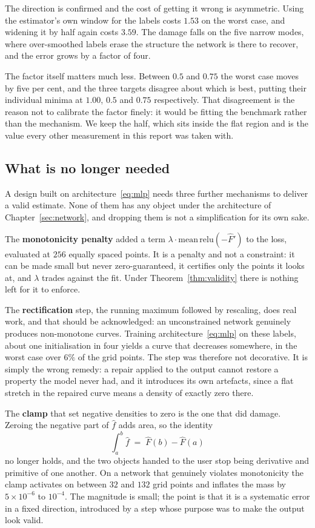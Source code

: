 \documentclass[11pt]{article}
\newcommand{\Fhat}{\widehat{F}}
\newcommand{\fhat}{\widehat{f}}
\begin{document}
The direction is confirmed and the cost of getting it wrong is asymmetric. Using the
estimator's own window for the labels costs $1.53$ on the worst case, and widening it by half
again costs $3.59$. The damage falls on the five narrow modes, where over-smoothed labels
erase the structure the network is there to recover, and the error grows by a factor of four.

The factor itself matters much less. Between $0.5$ and $0.75$ the worst case moves by five
per cent, and the three targets disagree about which is best, putting their individual minima
at $1.00$, $0.5$ and $0.75$ respectively. That disagreement is the reason not to calibrate the
factor finely: it would be fitting the benchmark rather than the mechanism. We keep the half,
which sits inside the flat region and is the value every other measurement in this report was
taken with.

\subsection{What is no longer needed}

A design built on architecture~\eqref{eq:mlp} needs three further mechanisms to deliver a
valid estimate. None of them has any object under the architecture of
Chapter~\ref{sec:network}, and dropping them is not a simplification for its own sake.

The \textbf{monotonicity penalty} added a term $\lambda \cdot \mathrm{mean}\,
\mathrm{relu}(-\Fhat')$ to the loss, evaluated at $256$ equally spaced points. It is a
penalty and not a constraint: it can be made small but never zero-guaranteed, it certifies
only the points it looks at, and $\lambda$ trades against the fit. Under
Theorem~\ref{thm:validity} there is nothing left for it to enforce.

The \textbf{rectification} step, the running maximum followed by rescaling, does real work,
and that should be acknowledged: an unconstrained network genuinely produces non-monotone
curves.
Training architecture~\eqref{eq:mlp} on these labels, about one initialisation in four yields
a curve that decreases somewhere, in the worst case over $6\%$ of the grid points. The step was therefore not decorative. It is simply the wrong
remedy: a repair applied to the output cannot restore a property the model never had, and it
introduces its own artefacts, since a flat stretch in the repaired curve means a density of
exactly zero there.

The \textbf{clamp} that set negative densities to zero is the one that did damage. Zeroing the
negative part of $\fhat$ adds area, so the identity
\[
\int_a^b \fhat \;=\; \Fhat(b) - \Fhat(a)
\]
no longer holds, and the two objects handed to the user stop being derivative and primitive
of one another. On a network that genuinely violates monotonicity the clamp activates on
between $32$ and $132$ grid points and inflates the mass by $5 \times 10^{-6}$ to $10^{-4}$.
The magnitude is small; the point is that it is a systematic error in a fixed direction,
introduced by a step whose purpose was to make the output look valid.
\end{document}
